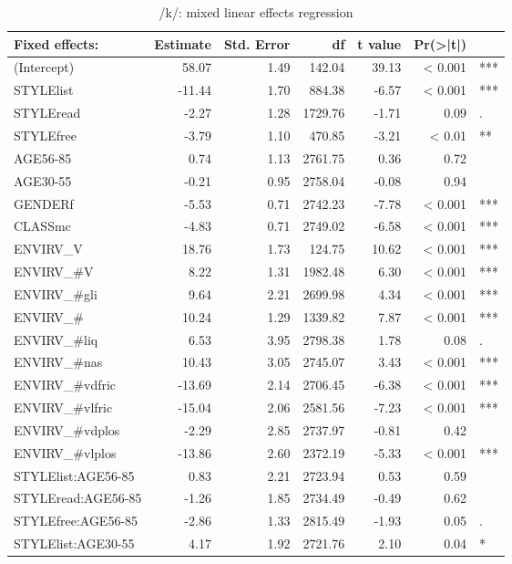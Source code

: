 \newpage 
{\footnotesize
	\begin{longtable}[c]{p{}rrrrrl}
				\caption{/k/: mixed linear effects regression}\label{tab.regression.k}\\
		\lsptoprule
		Fixed effects: & Estimate & Std. Error & df & t value & Pr(>|t|) & \\
		\midrule{}
		(Intercept) & 58.07 & 1.49 & 142.04 & 39.13 & < 0.001 & *** \\ 
		STYLElist & -11.44 & 1.70 & 884.38 & -6.57 & < 0.001 & *** \\ 
		STYLEread & -2.27 & 1.28 & 1729.76 & -1.71 & 0.09 & . \\ 
		STYLEfree & -3.79 & 1.10 & 470.85 & -3.21 & < 0.01 & ** \\ 
		AGE56-85 & 0.74 & 1.13 & 2761.75 & 0.36 & 0.72 & \\ 
		AGE30-55 & -0.21 & 0.95 & 2758.04 & -0.08 & 0.94 & \\ 
		GENDERf & -5.53 & 0.71 & 2742.23 & -7.78 & < 0.001 & *** \\ 
		CLASSmc & -4.83 & 0.71 & 2749.02 & -6.58 & < 0.001 & *** \\ 
		ENVIRV\_V & 18.76 & 1.73 & 124.75 & 10.62 & < 0.001 & *** \\ 
		ENVIRV\_\#V & 8.22 & 1.31 & 1982.48 & 6.30 & < 0.001 & *** \\ 
		ENVIRV\_\#gli & 9.64 & 2.21 & 2699.98 & 4.34 & < 0.001 & *** \\ 
		ENVIRV\_\# & 10.24 & 1.29 & 1339.82 & 7.87 & < 0.001 & *** \\ 
		ENVIRV\_\#liq & 6.53 & 3.95 & 2798.38 & 1.78 & 0.08 & . \\ 
		ENVIRV\_\#nas & 10.43 & 3.05 & 2745.07 & 3.43 & < 0.001 & *** \\ 
		ENVIRV\_\#vdfric & -13.69 & 2.14 & 2706.45 & -6.38 & < 0.001 & *** \\ 
		ENVIRV\_\#vlfric & -15.04 & 2.06 & 2581.56 & -7.23 & < 0.001 & *** \\ 
		ENVIRV\_\#vdplos & -2.29 & 2.85 & 2737.97 & -0.81 & 0.42 & \\ 
		ENVIRV\_\#vlplos & -13.86 & 2.60 & 2372.19 & -5.33 & < 0.001 & *** \\ 
		STYLElist:AGE56-85 & 0.83 & 2.21 & 2723.94 & 0.53 & 0.59 & \\ 
		STYLEread:AGE56-85 & -1.26 & 1.85 & 2734.49 & -0.49 & 0.62 & \\ 
		STYLEfree:AGE56-85 & -2.86 & 1.33 & 2815.49 & -1.93 & 0.05 & . \\ 
		STYLElist:AGE30-55 & 4.17 & 1.92 & 2721.76 & 2.10 & 0.04 & * \\ 

\end{longtable}}

